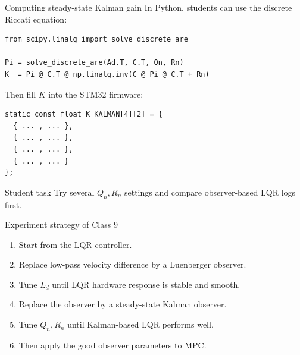 \documentclass[aspectratio=169]{beamer}
\begin{document}
\begin{frame}[fragile]{Computing steady-state Kalman gain}
In Python, students can use the discrete Riccati equation:
\begin{lstlisting}[basicstyle=\ttfamily\scriptsize]
from scipy.linalg import solve_discrete_are

Pi = solve_discrete_are(Ad.T, C.T, Qn, Rn)
K  = Pi @ C.T @ np.linalg.inv(C @ Pi @ C.T + Rn)
\end{lstlisting}

\vspace{0.2cm}
Then fill \(K\) into the STM32 firmware:
\begin{lstlisting}[basicstyle=\ttfamily\scriptsize]
static const float K_KALMAN[4][2] = {
  { ... , ... },
  { ... , ... },
  { ... , ... },
  { ... , ... }
};
\end{lstlisting}

\vspace{0.1cm}
\begin{alertblock}{Student task}
\small
Try several \(Q_n,R_n\) settings and compare observer-based LQR logs first.
\end{alertblock}
\end{frame}

\begin{frame}{Experiment strategy of Class 9}
\begin{enumerate}
    \item Start from the LQR controller.
    \vspace{0.2cm}
    \item Replace low-pass velocity difference by a Luenberger observer.
    \vspace{0.2cm}
    \item Tune \(L_d\) until LQR hardware response is stable and smooth.
    \vspace{0.2cm}
    \item Replace the observer by a steady-state Kalman observer.
    \vspace{0.2cm}
    \item Tune \(Q_n,R_n\) until Kalman-based LQR performs well.
    \vspace{0.2cm}
    \item Then apply the good observer parameters to MPC.
\end{enumerate}
\end{frame}
\end{document}
